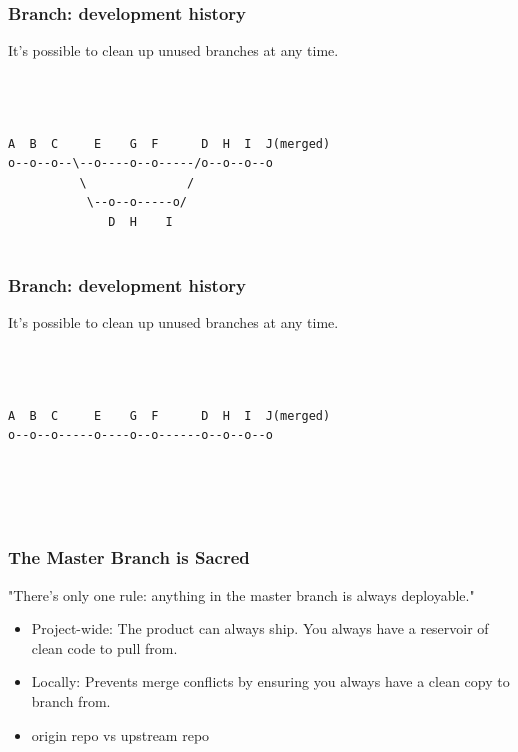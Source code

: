 \documentclass[unknownkeysallowed]{beamer}
\begin{document}
\begin{frame}[fragile]
	\frametitle{Branch: development history}
	It's possible to clean up unused branches at any time.
\begin{verbatim}
                   
                
               
A  B  C     E    G  F      D  H  I  J(merged)
o--o--o--\--o----o--o-----/o--o--o--o
          \              /
           \--o--o-----o/
              D  H    I
                      
\end{verbatim}
\end{frame}

\begin{frame}[fragile]
	\frametitle{Branch: development history}
	It's possible to clean up unused branches at any time.
\begin{verbatim}
                   
                
               
A  B  C     E    G  F      D  H  I  J(merged)
o--o--o-----o----o--o------o--o--o--o
          
          
          
                      
\end{verbatim}
\end{frame}

\begin{frame}
    \frametitle{The Master Branch is Sacred}
    "There's only one rule: anything in the master branch is always deployable."
    \vspace{0.25cm}
    \begin{itemize}
        \item{Project-wide: The product can always ship. You always have a reservoir of clean code to pull from.}
        \item{Locally: Prevents merge conflicts by ensuring you always have a clean copy to branch from.}
        \item{origin repo vs upstream repo}
    \end{itemize}
\end{frame}
\end{document}
